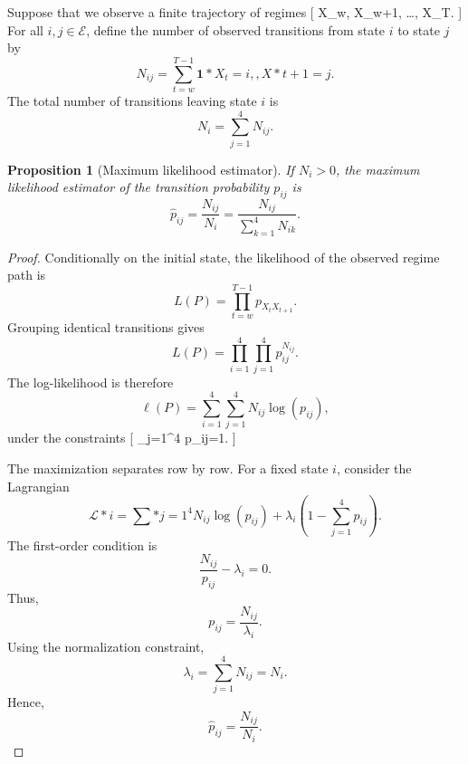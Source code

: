 \documentclass[11pt,a4paper]{article}
\newtheorem{proposition}{Proposition}
\begin{document}
Suppose that we observe a finite trajectory of regimes
[
X_w, X_{w+1}, \ldots, X_T.
]
For all $i,j \in \mathcal{E}$, define the number of observed transitions from state $i$ to state $j$ by
\begin{equation}
N_{ij}
=
\sum_{t=w}^{T-1}
\mathbf{1}*{{X_t=i,,X*{t+1}=j}}.
\end{equation}
The total number of transitions leaving state $i$ is
\begin{equation}
N_i = \sum_{j=1}^{4} N_{ij}.
\end{equation}

\begin{proposition}[Maximum likelihood estimator]
If $N_i>0$, the maximum likelihood estimator of the transition probability $p_{ij}$ is
\begin{equation}
\widehat p_{ij}
=
\frac{N_{ij}}{N_i}
=
\frac{N_{ij}}{\sum_{k=1}^{4}N_{ik}}.
\end{equation}
\end{proposition}

\begin{proof}
Conditionally on the initial state, the likelihood of the observed regime path is
\begin{equation}
L(P)
=
\prod_{t=w}^{T-1}
p_{X_tX_{t+1}}.
\end{equation}
Grouping identical transitions gives
\begin{equation}
L(P)
=
\prod_{i=1}^{4}
\prod_{j=1}^{4}
p_{ij}^{N_{ij}}.
\end{equation}
The log-likelihood is therefore
\begin{equation}
\ell(P)
=
\sum_{i=1}^{4}
\sum_{j=1}^{4}
N_{ij}\log(p_{ij}),
\end{equation}
under the constraints
[
\sum_{j=1}^{4} p_{ij}=1.
]

The maximization separates row by row. For a fixed state $i$, consider the Lagrangian
\begin{equation}
\mathcal{L}*i
=
\sum*{j=1}^{4} N_{ij}\log(p_{ij})
+
\lambda_i
\left(1-\sum_{j=1}^{4}p_{ij}\right).
\end{equation}
The first-order condition is
\begin{equation}
\frac{N_{ij}}{p_{ij}}-\lambda_i=0.
\end{equation}
Thus,
\begin{equation}
p_{ij} = \frac{N_{ij}}{\lambda_i}.
\end{equation}
Using the normalization constraint,
\begin{equation}
\lambda_i = \sum_{j=1}^{4} N_{ij}=N_i.
\end{equation}
Hence,
\begin{equation}
\widehat p_{ij}
=
\frac{N_{ij}}{N_i}.
\end{equation}
\end{proof}
\end{document}
